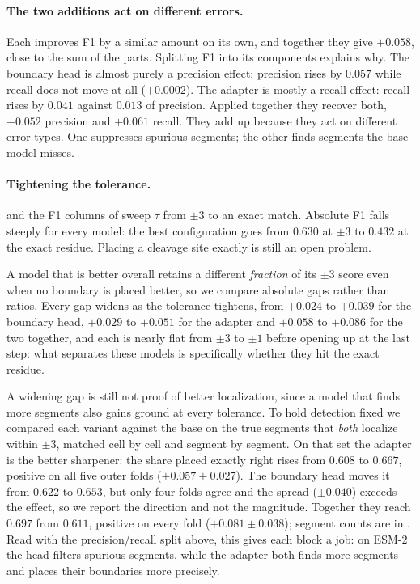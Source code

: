\documentclass{article}
\begin{document}
\paragraph{The two additions act on different errors.} Each improves F1 by a similar amount on its own, and together they give $+0.058$, close to the sum of the parts. Splitting F1 into its components explains why. The boundary head is almost purely a precision effect: precision rises by $0.057$ while recall does not move at all ($+0.0002$). The adapter is mostly a recall effect: recall rises by $0.041$ against $0.013$ of precision. Applied together they recover both, $+0.052$ precision and $+0.061$ recall. They add up because they act on different error types. One suppresses spurious segments; the other finds segments the base model misses.

\paragraph{Tightening the tolerance.}  and the F1 columns of  sweep $\tau$ from $\pm3$ to an exact match. Absolute F1 falls steeply for every model: the best configuration goes from $0.630$ at $\pm3$ to $0.432$ at the exact residue. Placing a cleavage site exactly is still an open problem.

A model that is better overall retains a different \emph{fraction} of its $\pm3$ score even when no boundary is placed better, so we compare absolute gaps rather than ratios. Every gap widens as the tolerance tightens, from $+0.024$ to $+0.039$ for the boundary head, $+0.029$ to $+0.051$ for the adapter and $+0.058$ to $+0.086$ for the two together, and each is nearly flat from $\pm3$ to $\pm1$ before opening up at the last step: what separates these models is specifically whether they hit the exact residue.

A widening gap is still not proof of better localization, since a model that finds more segments also gains ground at every tolerance. To hold detection fixed we compared each variant against the base on the true segments that \emph{both} localize within $\pm3$, matched cell by cell and segment by segment. On that set the adapter is the better sharpener: the share placed exactly right rises from $0.608$ to $0.667$, positive on all five outer folds ($+0.057\pm0.027$). The boundary head moves it from $0.622$ to $0.653$, but only four folds agree and the spread ($\pm0.040$) exceeds the effect, so we report the direction and not the magnitude. Together they reach $0.697$ from $0.611$, positive on every fold ($+0.081\pm0.038$); segment counts are in . Read with the precision/recall split above, this gives each block a job: on ESM-2 the head filters spurious segments, while the adapter both finds more segments and places their boundaries more precisely.
\end{document}
